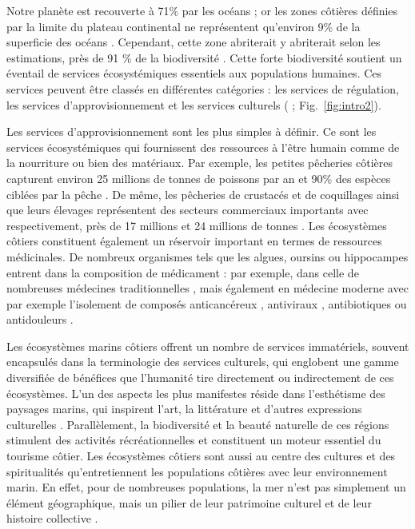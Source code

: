 \begin{refsection}
Notre planète est recouverte à 71\% par les océans ; or les zones
côtières définies par la limite du plateau continental ne représentent
qu'environ 9\% de la superficie des océans \autocite{Harris_2014}.
Cependant, cette zone abriterait y abriterait selon les estimations,
près de 91 \% de la biodiversité \autocite{Costello_2017}. Cette forte
biodiversité soutient un éventail de services écosystémiques essentiels
aux populations humaines. Ces services peuvent être classés en
différentes catégories : les services de régulation, les services
d'approvisionnement et les services culturels (\textcite{Reid_2005} ;
Fig.~\ref{fig:intro2}).

Les services d'approvisionnement sont les plus simples à définir. Ce
sont les services écosystémiques qui fournissent des ressources à l'être
humain comme de la nourriture ou bien des matériaux. Par exemple, les
petites pêcheries côtières capturent environ 25 millions de tonnes de
poissons par an \autocite{Cochrane_2023} et 90\% des espèces ciblées par
la pêche \autocite{FAO_yearbook_2022}. De même, les pêcheries de
crustacés et de coquillages ainsi que leurs élevages représentent des
secteurs commerciaux importants avec respectivement, près de 17 millions
et 24 millions de tonnes \autocite{FAO_yearbook_2022}. Les écosystèmes
côtiers constituent également un réservoir important en termes de
ressources médicinales. De nombreux organismes tels que les algues,
oursins ou hippocampes entrent dans la composition de médicament : par
exemple, dans celle de nombreuses médecines traditionnelles \autocites[
]{Kumaravel_2012}[ ]{Thurstan_2018}{Sibiya_2021}, mais également en
médecine moderne avec par exemple l'isolement de composés anticancéreux
\autocite{Schwartsmann_2001}, antiviraux \autocite{Yasuhara-Bell_2010},
antibiotiques \autocite{Benoist_2020} ou antidouleurs
\autocite{Miljanich_2004}.

Les écosystèmes marins côtiers offrent un nombre de services
immatériels, souvent encapsulés dans la terminologie des services
culturels, qui englobent une gamme diversifiée de bénéfices que
l'humanité tire directement ou indirectement de ces écosystèmes. L'un
des aspects les plus manifestes réside dans l'esthétisme des paysages
marins, qui inspirent l'art, la littérature et d'autres expressions
culturelles \autocite{Ghermandi_2010}. Parallèlement, la biodiversité et
la beauté naturelle de ces régions stimulent des activités
récréationnelles et constituent un moteur essentiel du tourisme côtier.
Les écosystèmes côtiers sont aussi au centre des cultures et des
spiritualités qu'entretiennent les populations côtières avec leur
environnement marin. En effet, pour de nombreuses populations, la mer
n'est pas simplement un élément géographique, mais un pilier de leur
patrimoine culturel et de leur histoire collective
\autocite{Ghermandi_2010}.


\end{refsection}
